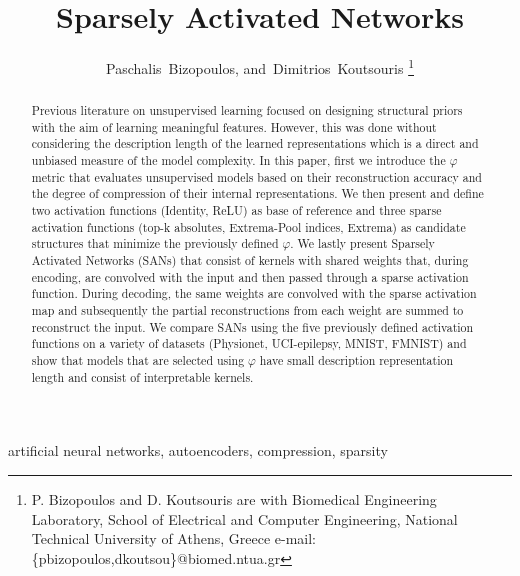 \documentclass[journal]{IEEEtran}
\begin{document}

\title{Sparsely Activated Networks}
\author{Paschalis~Bizopoulos, and~Dimitrios~Koutsouris
\thanks{P. Bizopoulos and D. Koutsouris are with Biomedical Engineering Laboratory, School of Electrical and Computer Engineering, National Technical University of Athens, Greece e-mail: \{pbizopoulos,dkoutsou\}@biomed.ntua.gr}}

\maketitle

\begin{abstract}
	Previous literature on unsupervised learning focused on designing structural priors with the aim of learning meaningful features.
	However, this was done without considering the description length of the learned representations which is a direct and unbiased measure of the model complexity.
	In this paper, first we introduce the $\varphi$ metric that evaluates unsupervised models based on their reconstruction accuracy and the degree of compression of their internal representations.
	We then present and define two activation functions (Identity, ReLU) as base of reference and three sparse activation functions (top-k absolutes, Extrema-Pool indices, Extrema) as candidate structures that minimize the previously defined $\varphi$.
	We lastly present Sparsely Activated Networks (SANs) that consist of kernels with shared weights that, during encoding, are convolved with the input and then passed through a sparse activation function.
	During decoding, the same weights are convolved with the sparse activation map and subsequently the partial reconstructions from each weight are summed to reconstruct the input.
	We compare SANs using the five previously defined activation functions on a variety of datasets (Physionet, UCI-epilepsy, MNIST, FMNIST) and show that models that are selected using $\varphi$ have small description representation length and consist of interpretable kernels.
\end{abstract}

\begin{IEEEkeywords}
	artificial neural networks, autoencoders, compression, sparsity
\end{IEEEkeywords}
\end{document}
